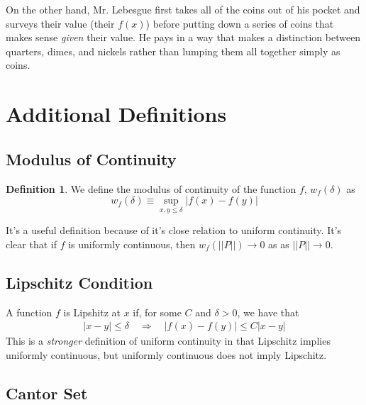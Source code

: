 \documentclass[12pt]{article}
\theoremstyle{plain}
\theoremstyle{definition}
\newtheorem{defn}[thm]{Definition}
\theoremstyle{remark}
\begin{document}
On the other hand, Mr. Lebesgue first takes all of the coins out of his pocket and surveys their value (their $f(x)$) before putting down a series of coins that makes sense \emph{given} their value. He pays in a way that makes a distinction between quarters, dimes, and nickels rather than lumping them all together simply as coins. 



\newpage
\appendix
\section{Additional Definitions}

\subsection{Modulus of Continuity}

\begin{defn} We define the modulus of continuity of the function $f$, $w_f(\delta)$ as 
\begin{equation}
    w_f(\delta) \equiv \sup_{x,y\leq\delta} |f(x)-f(y)|
\end{equation}
\end{defn}
It's a useful definition because of it's close relation to uniform continuity.
It's clear that if $f$ is uniformly continuous, then $w_f\left(||P||\right)\rightarrow0$ as as $||P||\rightarrow0$.

\subsection{Lipschitz Condition}

A function $f$ is Lipshitz at $x$ if, for some $C$ and $\delta>0$, we have that 
\begin{align*}
    |x-y|\leq \delta \quad \Rightarrow \quad 
        |f(x) - f(y)|\leq C|x-y|
\end{align*}
This is a \emph{stronger} definition of uniform continuity in that Lipschitz implies uniformly continuous, but uniformly continuous does not imply Lipschitz.

\subsection{Cantor Set}
\end{document}
